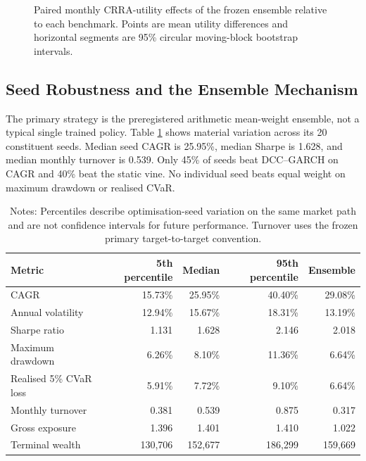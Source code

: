 \begin{figure}[htbp]
\centering

\caption{Paired monthly CRRA-utility effects of the frozen ensemble relative to each benchmark. Points are mean utility differences and horizontal segments are 95\% circular moving-block bootstrap intervals.}
\label{fig:primary_utility_effects}
\end{figure}

\subsection{Seed Robustness and the Ensemble Mechanism}
\label{subsec:4_seed_robustness}

The primary strategy is the preregistered arithmetic mean-weight ensemble, not a typical single trained policy. Table \ref{tab:seed_robustness} shows material variation across its 20 constituent seeds. Median seed CAGR is 25.95\%, median Sharpe is 1.628, and median monthly turnover is 0.539. Only 45\% of seeds beat DCC--GARCH on CAGR and 40\% beat the static vine. No individual seed beats equal weight on maximum drawdown or realised CVaR.

\begin{table}[H]
\centering
\caption{Dispersion Across 20 Frozen Primary Training Seeds}
\label{tab:seed_robustness}
\begin{tabular}{l r r r r}
\toprule
\textbf{Metric} & \textbf{5th percentile} & \textbf{Median} & \textbf{95th percentile} & \textbf{Ensemble} \\
\midrule
CAGR & 15.73\% & 25.95\% & 40.40\% & 29.08\% \\
Annual volatility & 12.94\% & 15.67\% & 18.31\% & 13.19\% \\
Sharpe ratio & 1.131 & 1.628 & 2.146 & 2.018 \\
Maximum drawdown & 6.26\% & 8.10\% & 11.36\% & 6.64\% \\
Realised 5\% CVaR loss & 5.91\% & 7.72\% & 9.10\% & 6.64\% \\
Monthly turnover & 0.381 & 0.539 & 0.875 & 0.317 \\
Gross exposure & 1.396 & 1.401 & 1.410 & 1.022 \\
Terminal wealth & 130,706 & 152,677 & 186,299 & 159,669 \\
\bottomrule
\end{tabular}
\caption*{\footnotesize Notes: Percentiles describe optimisation-seed variation on the same market path and are not confidence intervals for future performance. Turnover uses the frozen primary target-to-target convention.}
\end{table}

